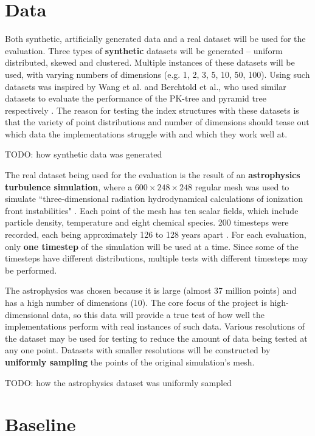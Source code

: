 \section{Data}

Both synthetic, artificially generated data and a real dataset will be used for the evaluation. Three types of \textbf{synthetic} datasets will be generated -- uniform distributed, skewed and clustered. Multiple instances of these datasets will be used, with varying numbers of dimensions (e.g. 1, 2, 3, 5, 10, 50, 100). Using such datasets was inspired by Wang et al. and Berchtold et al., who used similar datasets to evaluate the performance of the PK-tree and pyramid tree respectively \cite{pk-tree, pyramid-tree}. The reason for testing the index structures with these datasets is that the variety of point distributions and number of dimensions should tease out which data the implementations struggle with and which they work well at.

TODO: how synthetic data was generated

The real dataset being used for the evaluation is the result of an \textbf{astrophysics turbulence simulation}, where a $600 \times 248 \times 248$ regular mesh was used to simulate ``three-dimensional radiation hydrodynamical calculations of ionization front instabilities" \cite{astrophysics-dataset}. Each point of the mesh has ten scalar fields, which include particle density, temperature and eight chemical species. 200 timesteps were recorded, each being approximately 126 to 128 years apart \cite{astrophysics-dataset}. For each evaluation, only \textbf{one timestep} of the simulation will be used at a time. Since some of the timesteps have different distributions, multiple tests with different timesteps may be performed.

The astrophysics was chosen because it is large (almost 37 million points) and has a high number of dimensions (10). The core focus of the project is high-dimensional data, so this data will provide a true test of how well the implementations perform with real instances of such data. Various resolutions of the dataset may be used for testing to reduce the amount of data being tested at any one point. Datasets with smaller resolutions will be constructed by \textbf{uniformly sampling} the points of the original simulation's mesh.

TODO: how the astrophysics dataset was uniformly sampled

\section{Baseline}

